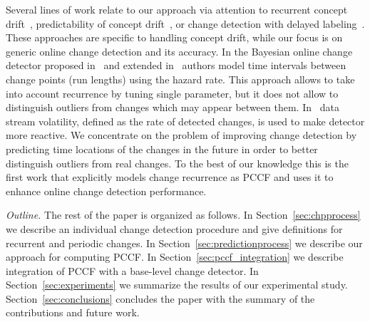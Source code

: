 Several lines of work relate to our approach via attention to recurrent concept drift~\cite{GamaK11,DBLP:journals/tnn/GomesGSR14,DBLP:journals/ida/GomesSR12}, predictability of concept drift~\cite{Ang2013}, or change detection with delayed labeling~\cite{DBLP:conf/icdm/Zliobaite10}.
These approaches are specific to handling concept drift, while our focus is on generic online change detection and its accuracy.
In the Bayesian online change detector proposed in~\cite{mackay2007} and extended in~\cite{ Wilson2010a} authors model time intervals between change points (run lengths) using the hazard rate.
This approach allows to take into account recurrence by tuning single parameter, but it does not allow to distinguish outliers from changes which may appear between them.
In~\cite{huang2014detecting} data stream volatility, defined as the rate of detected changes, is used to make detector more reactive.
We concentrate on the problem of improving change detection  by predicting time locations of the changes in the future in order to better distinguish outliers from real changes.
To the best of our knowledge this is the first work that explicitly models change recurrence as PCCF and uses it to enhance online change detection performance.

\emph{Outline.} The rest of the paper is organized as follows.
In Section~\ref{sec:chpprocess} we describe an individual change detection procedure and give definitions for recurrent and periodic changes.
In Section~\ref{sec:predictionprocess} we describe our approach for computing PCCF. %
In Section~\ref{sec:pccf_integration} we describe integration of PCCF with a base-level change detector.
In Section~\ref{sec:experiments} we summarize the results of our experimental study.
Section~\ref{sec:conclusions} concludes the paper with the summary of the contributions and future work.

